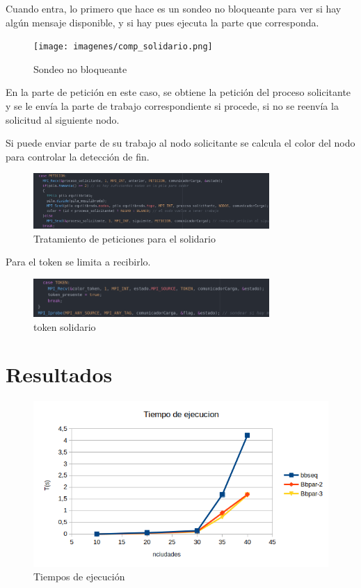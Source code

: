 Cuando entra, lo primero que hace es un sondeo no bloqueante para ver si hay algún mensaje disponible, y si hay pues ejecuta la parte que corresponda.

\begin{figure}[H]
\centering
\texttt{[image: imagenes/comp\_solidario.png]}
\caption{Sondeo no bloqueante}
\end{figure}

En la parte de petición en este caso, se obtiene la petición del proceso solicitante y se le envía la parte de trabajo correspondiente si procede, si no se reenvía la solicitud al siguiente nodo.

Si puede enviar parte de su trabajo al nodo solicitante se calcula el color del nodo para controlar la detección de fin.

\begin{figure}[H]
\centering
\includegraphics[width=0.8\textwidth]{imagenes/peticion_solidario.png}
\caption{Tratamiento de peticiones para el solidario}
\end{figure}

Para el token se limita a recibirlo.

\begin{figure}[H]
\centering
\includegraphics[width=0.8\textwidth]{imagenes/token_solidario.png}
\caption{token solidario}
\end{figure}

\section{Resultados}

\begin{figure}[H]
\centering
\includegraphics[width=\textwidth]{imagenes/times.png}
\caption{Tiempos de ejecución}
\end{figure}


